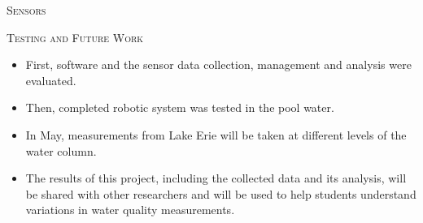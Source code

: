 \documentclass[final,t]{beamer}
\begin{document}
\begin{frame}{}
\begin{columns}
\begin{column}{.5\linewidth}
\begin{block}{\textsc{Sensors}}
                    \vspace*{3mm}
                \end{block}

                \begin{alertblock}{\textsc{Testing and Future Work}}
                    \vspace*{3mm}
                    \begin{itemize}
                    	\item First, software and the sensor data collection, management and analysis were evaluated.
                    	\item Then, completed robotic system was tested in the pool water.
                    	\item In May, measurements from Lake Erie will be taken at different levels of the water column. 
                    	\item The results of this project, including the collected data and its analysis, will be shared with other researchers and will be used to help students understand variations in water quality measurements. 
                    \end{itemize}

                    
                    \vspace*{3mm}
                \end{alertblock}
            \end{column}


        \end{columns}
    \end{frame}
\end{document}

